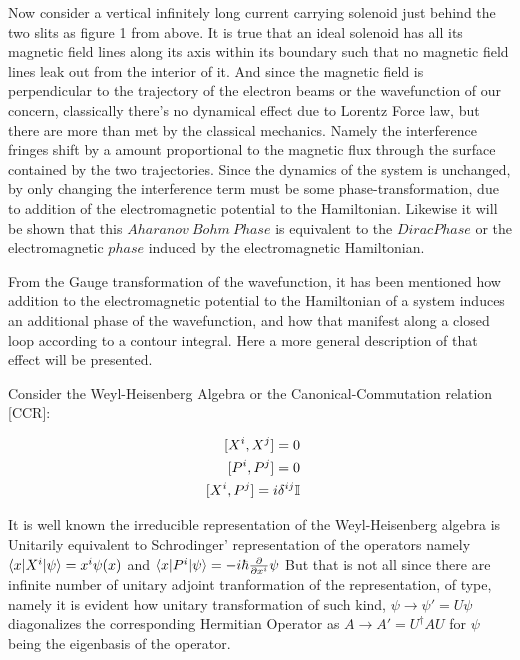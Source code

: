 \documentclass[8pt, twocoloumn]{article}
\begin{document}
Now consider a vertical infinitely long current carrying solenoid just behind the two slits as figure 1 from above. It is true that an ideal solenoid has all its magnetic field lines along its axis within its boundary such that no magnetic field lines leak out from the interior of it. And since the magnetic field is perpendicular to the trajectory of the electron beams or the wavefunction of our concern, classically there's no dynamical effect due to Lorentz Force law, but there are more than met by the classical mechanics. Namely the interference fringes shift by a amount proportional to the magnetic flux through the surface contained by the two trajectories. Since the dynamics of the system is unchanged, by only changing the interference term must be some phase-transformation, due to addition of the electromagnetic potential to the Hamiltonian. Likewise it will be shown that this $Aharanov \ Bohm \ Phase$ is equivalent to the $Dirac Phase$ or the electromagnetic $phase$ induced by the electromagnetic Hamiltonian.

From the Gauge transformation of the wavefunction, it has been mentioned how addition to the electromagnetic potential to the Hamiltonian of a system induces an additional phase of the wavefunction, and how that manifest along a closed loop according to a contour integral. Here a more general description of that effect will be presented. 

Consider the Weyl-Heisenberg Algebra or the Canonical-Commutation relation [CCR]: 

\begin{align}
\begin{split}
[X^i , X^j]={}& 0 \notag
\end{split} \\
\begin{split}
[P^i , P^j]={}& 0 \notag
\end{split}\\
\begin{split}
[X^i , P^j]={}& i\delta^{ij} \mathbb{I} 
\end{split}
\end{align}

It is well known the irreducible representation of the Weyl-Heisenberg algebra is Unitarily equivalent to Schrodinger' representation of the operators namely $\braket{x|X^i|\psi}=x^i\psi(x)$ and $\braket{x|P^i|\psi}=-i\hbar\frac{\partial}{\partial x^i}\psi$
But that is not all since there are infinite number of unitary adjoint tranformation of the representation, of type, namely it is evident how unitary transformation of such kind, $\psi \to \psi'=U\psi$ diagonalizes the corresponding Hermitian Operator as $A \to A'=U^{\dag}AU$ for $\psi$ being the eigenbasis of the operator.
\end{document}

